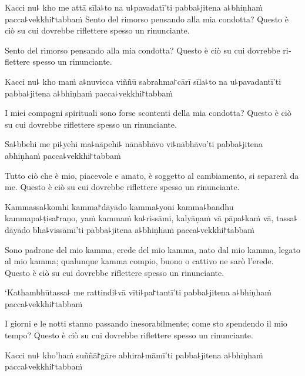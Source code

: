 \clearpage

Kacci nu꜕ kho me attā sīla꜕to na u꜕pavadatī'ti pabba꜕jitena a꜕bhiṇhaṁ pacca꜕vekkhi꜓tabbaṁ
Sento del rimorso pensando alla mia condotta?
Questo è ciò su cui dovrebbe riflettere spesso un rinunciante.


\begin{english}
Sento del rimorso pensando alla mia condotta?
Questo è ciò su cui dovrebbe riflettere spesso un rinunciante.
\end{english}

Kacci nu꜕ kho maṁ a꜕nuvicca viññū sabrahma꜓cārī sīla꜕to na u꜕pavadantī'ti pabba꜕jitena a꜕bhiṇhaṁ pacca꜕vekkhi꜓tabbaṁ

\begin{english}
I miei compagni spirituali sono forse scontenti della mia condotta?
Questo è ciò su cui dovrebbe riflettere spesso un rinunciante.
\end{english}

Sa꜕bbehi me pi꜕yehi ma꜕nāpehi꜕ nānābhāvo vi꜕nābhāvo'ti pabba꜕jitena abhiṇhaṁ pacca꜕vekkhi꜓tabbaṁ

\begin{english}
Tutto ciò che è mio, piacevole e amato, è soggetto al cambiamento, si separerà da me.
Questo è ciò su cui dovrebbe riflettere spesso un rinunciante.
\end{english}

Kammassa꜕komhi kamma꜓dāyādo kamma꜕yoni kamma꜕bandhu kammapa꜕ṭisa꜓raṇo, yaṁ kammaṁ ka꜕rissāmi, kalyāṇaṁ vā pāpa꜕kaṁ vā, tassa꜕ dāyādo bha꜕vissāmī'ti pabba꜕jitena a꜕bhiṇhaṁ pacca꜕vekkhi꜓tabbaṁ

\begin{english}
Sono padrone del mio kamma, erede del mio kamma, nato dal mio kamma, legato al mio kamma;
 qualunque kamma compio, buono o cattivo ne sarò l'erede.
 Questo è ciò su cui dovrebbe riflettere spesso un rinunciante.
\end{english}

\clearpage

`Kathambhūtassa꜕ me rattindi꜕vā vīti꜕pa꜓tantī'ti pabba꜕jitena a꜕bhiṇhaṁ pacca꜕vekkhi꜓tabbaṁ

\begin{english}
 I giorni e le notti stanno passando inesorabilmente; come sto spendendo il mio tempo?
 Questo è ciò su cui dovrebbe riflettere spesso un rinunciante.
\end{english}

Kacci nu꜕ kho'haṁ suññā꜓gāre abhira꜕māmī'ti pabba꜕jitena a꜕bhiṇhaṁ pacca꜕vekkhi꜓tabbaṁ

